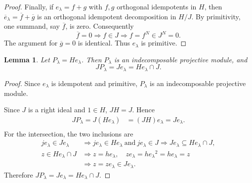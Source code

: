 \documentclass[10pt,oneside]{amsart}
\newtheorem{lemma}[proposition]{Lemma}
\theoremstyle{definition}
\begin{document}
\begin{proof}
Finally, if $e_\lambda=f+g$ with $f,g$ orthogonal idempotents in $H$,
then $\overline e_\lambda=\overline f+\overline g$ is an orthogonal
idempotent decomposition in $H/J$. By primitivity, one summand,
say $\overline f$, is zero. Consequently
\[
 \overline f=0\Longrightarrow f\in J
 \Longrightarrow f=f^N\in J^N=0.
\]
The argument for $\overline g=0$ is identical. Thus $e_\lambda$ is primitive.
\end{proof}


\begin{lemma}\label{lem:projective-ideal-detailed}
Let $P_\lambda=He_\lambda$. Then  $P_\lambda$ is an indecomposable projective module, and
\[
 JP_\lambda=Je_\lambda=He_\lambda\cap J.
\]
\end{lemma}
\begin{proof}
Since $e_\lambda$ is idempotent and primitive, $P_\lambda$ is an indecomposable projective module.

Since $J$ is a right ideal and $1\in H$, $JH=J$.
Hence
\begin{align*}
 JP_\lambda=J(He_\lambda)&=(JH)e_\lambda=Je_\lambda.\\
\end{align*}
For the intersection, the two inclusions are
\begin{align*}
 je_\lambda\in Je_\lambda&\Longrightarrow je_\lambda\in He_\lambda\ \text{and}\ je_\lambda\in J
          \Longrightarrow Je_\lambda\subseteq He_\lambda\cap J,\\
 z\in He_\lambda\cap J&\Longrightarrow z=he_\lambda,
 \quad ze_\lambda=h{e_\lambda}^2=he_\lambda=z\\
 &\Longrightarrow z=ze_\lambda\in Je_\lambda.
\end{align*}
Therefore $JP_\lambda=Je_\lambda=He_\lambda\cap J$.
\end{proof}
\end{document}
